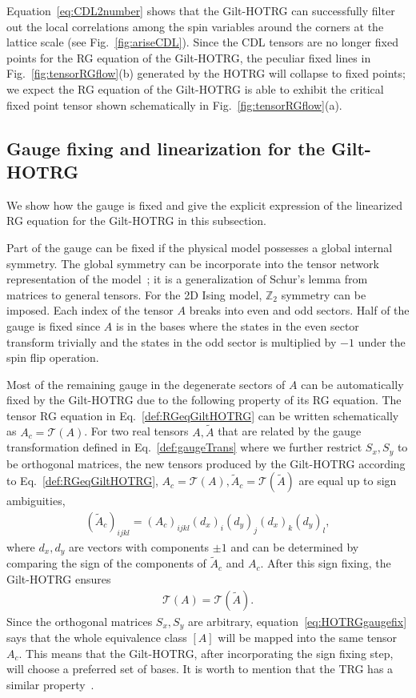 \documentclass[aps,prb,reprint,superscriptaddress,floatfix]{revtex4-2}
\begin{document}
Equation~\eqref{eq:CDL2number} shows that the Gilt-HOTRG can successfully filter out the local correlations among the spin variables around the corners at the lattice scale (see Fig.~\ref{fig:ariseCDL}).
Since the CDL tensors are no longer fixed points for the RG equation of the Gilt-HOTRG, the peculiar fixed lines in Fig.~\ref{fig:tensorRGflow}(b) generated by the HOTRG will collapse to fixed points; we expect the RG equation of the Gilt-HOTRG is able to exhibit the critical fixed point tensor shown schematically in Fig.~\ref{fig:tensorRGflow}(a).
%

\subsection{Gauge fixing and linearization for the Gilt-HOTRG\label{sec:gaugefix}}
We show how the gauge is fixed and give the explicit expression of the linearized RG equation for the Gilt-HOTRG in this subsection.
%

Part of the gauge can be fixed if the physical model possesses a global internal symmetry.
The global symmetry can be incorporate into the tensor network representation of the model~\cite{Singh2010SymTen,Singh2011U1Ten,Singh2012SU2Ten}; it is a generalization of Schur's lemma from matrices to general tensors.
For the 2D Ising model, $\mathbb{Z}_2$ symmetry can be imposed.
Each index of the tensor $A$ breaks into even and odd sectors.
Half of the gauge is fixed since $A$ is in the bases where the states in the even sector transform trivially and
the states in the odd sector is multiplied by $-1$ under the spin flip operation.
%

Most of the remaining gauge in the degenerate sectors of $A$ can be automatically fixed by the Gilt-HOTRG due to the following property of its RG equation.
The tensor RG equation in Eq.~\eqref{def:RGeqGiltHOTRG} can be written schematically as $A_c = \mathcal{T}\left(A\right)$.
For two real tensors $A, \tilde{A}$ that are related by the gauge transformation defined in Eq.~\eqref{def:gaugeTrans} where we further restrict $S_x,S_y$ to be orthogonal matrices, the new tensors produced by the Gilt-HOTRG according to Eq.~\eqref{def:RGeqGiltHOTRG}, $A_c = \mathcal{T}\left(A\right), \tilde{A}_c = \mathcal{T}(\tilde{A})$ are equal up to sign ambiguities,
%
\begin{align}\label{eq:signAmbi}
    \left(\tilde{A}_c \right)_{ijkl} =
    \left(A_c\right)_{ijkl}(d_x)_i (d_y)_j (d_x)_k (d_y)_l, 
\end{align}
%
where $d_x,d_y$ are vectors with components $\pm 1$ and can be determined by comparing the sign of the components of $\tilde{A}_c$ and $A_c$.
After this sign fixing, the Gilt-HOTRG ensures
%
\begin{align}\label{eq:HOTRGgaugefix}
    \mathcal{T}(A) = \mathcal{T}(\tilde{A}).
\end{align}
%
Since the orthogonal matrices $S_x, S_y$ are arbitrary, equation~\eqref{eq:HOTRGgaugefix} says that the whole equivalence class $[A]$ will be mapped into the same tensor $A_c$. 
This means that the Gilt-HOTRG, after incorporating the sign fixing step, will choose a preferred set of bases. 
It is worth to mention that the TRG has a similar property~\cite{kadanoff2014}.
%
\end{document}
